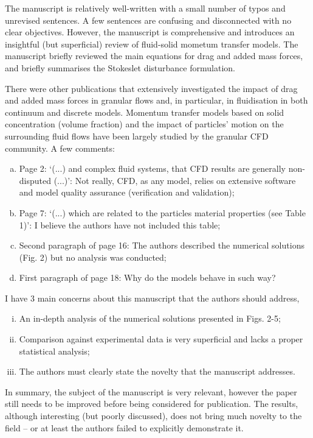 \documentclass[14pt,twoside]{report}
\begin{document}
The manuscript is relatively well-written with a small number of typos and unrevised sentences. A few sentences are confusing and disconnected with no clear objectives. However, the manuscript is comprehensive and introduces an insightful (but superficial) review of fluid-solid mometum transfer models. The manuscript briefly reviewed the main equations for drag and added mass forces, and briefly summarises the Stokeslet disturbance formulation. 

There were other publications that extensively investigated the impact of drag and added mass forces in granular flows and, in particular, in fluidisation in both continuum and discrete models. Momentum transfer models based on solid concentration (volume fraction) and the impact of particles' motion on the surrounding fluid flows have been largely studied by the granular CFD community. A few comments:
\begin{enumerate}[(a)] 
%
\item Page 2: `(...) and complex fluid systems, that CFD results are generally non-disputed (...)': Not really, CFD, as any model, relies on extensive software and model quality assurance (verification and validation); 
%
\item Page 7: `(...) which are related to the particles material properties (see Table 1)': I believe the authors have not included this table;
%
\item Second paragraph of page 16: The authors described the numerical solutions (Fig. 2) but no analysis was conducted;
%
\item First paragraph of page 18: Why do the models behave in such way? 
%
\end{enumerate}
I have 3 main concerns about this manuscript that the authors should address,
\begin{enumerate}[(i)]
\item An in-depth analysis of the numerical solutions presented in Figs. 2-5;
\item Comparison against experimental data is very superficial and lacks a proper statistical analysis;
\item The authors must clearly state the novelty that the manuscript addresses.
\end{enumerate}

In summary, the subject of the manuscript is very relevant, however the paper still needs to be improved before being considered for publication. The results, although interesting (but poorly discussed), does not bring much novelty to the field -- or at least the authors failed to explicitly demonstrate it. 
\end{document}
